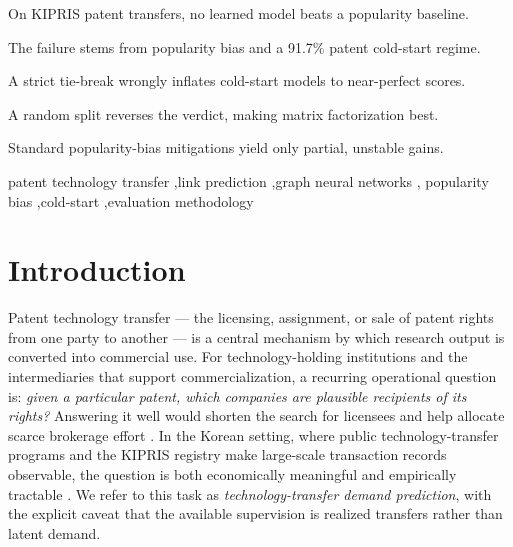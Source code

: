 \documentclass[preprint,12pt]{elsarticle}
\begin{document}
\begin{frontmatter}
\begin{highlights}
\item On KIPRIS patent transfers, no learned model beats a popularity baseline.
\item The failure stems from popularity bias and a 91.7\% patent cold-start regime.
\item A strict tie-break wrongly inflates cold-start models to near-perfect scores.
\item A random split reverses the verdict, making matrix factorization best.
\item Standard popularity-bias mitigations yield only partial, unstable gains.
\end{highlights}

\begin{keyword}
patent technology transfer \sep link prediction \sep graph neural networks \sep
popularity bias \sep cold-start \sep evaluation methodology
\end{keyword}

\end{frontmatter}

\section{Introduction}
\label{sec:intro}

Patent technology transfer --- the licensing, assignment, or sale of patent rights
from one party to another --- is a central mechanism by which research output is
converted into commercial use. For technology-holding institutions and the
intermediaries that support commercialization, a recurring operational question
is: \emph{given a particular patent, which companies are plausible recipients of
its rights?} Answering it well would shorten the search for licensees and help
allocate scarce brokerage effort \cite{kimgeum2020,lee2016}. In the Korean setting,
where public technology-transfer programs and the KIPRIS registry make large-scale
transaction records observable, the question is both economically meaningful and
empirically tractable \cite{rhee2026,parkyoon2017}. We refer to this task as
\emph{technology-transfer demand prediction}, with the explicit caveat that the
available supervision is realized transfers rather than latent demand.
\end{document}
